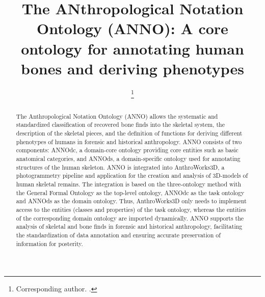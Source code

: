 \documentclass[sw]{iosart2x}
\begin{document}
\begin{frontmatter}

\title{The ANthropological Notation Ontology (ANNO): A core ontology for annotating human bones and deriving phenotypes}

\begin{aug}
\author[B,C]{ }
\author[A,C]{ %
\thanks{Corresponding author. .}
}
\author[B]{ }
\author[B]{ }
\author[A]{ }
\address[A]{Institute for Medical Informatics, Statistics and Epidemiology (IMISE), ,
Saxony, }
\address[B]{,
Saxony, }
\address[C]{equal contribution}
\end{aug}

\begin{abstract}
The Anthropological Notation Ontology (ANNO) allows the systematic and standardized classification of recovered bone finds into the skeletal system, the description of the skeletal pieces, and the definition of functions for deriving different phenotypes of humans in forensic and historical anthropology.
ANNO consists of two components:
ANNOdc, a domain-core ontology providing core entities such as basic anatomical categories, and ANNOds, a domain-specific ontology used for annotating structures of the human skeleton.
ANNO is integrated into AnthroWorks3D, a photogrammetry pipeline and application for the creation and analysis of 3D-models of human skeletal remains.
The integration is based on the three-ontology method with the General Formal Ontology as the top-level ontology, ANNOdc as the task ontology and ANNOds as the domain ontology.
Thus, AnthroWorks3D only needs to implement access to the entities (classes and properties) of the task ontology, whereas the entities of the corresponding domain ontology are imported dynamically.
ANNO supports the analysis of skeletal and bone finds in forensic and historical anthropology, facilitating the standardization of data annotation and ensuring accurate preservation of information for posterity.
\end{abstract}

\begin{keyword}
\end{keyword}

\end{frontmatter}
\end{document}
